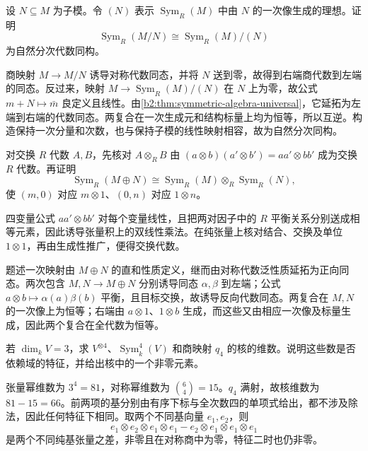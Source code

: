 \begin{exercise}\label{b2:ex:08-symmetric-quotient}
	设 \(N\subseteq M\) 为子模。令 \((N)\) 表示 \(\operatorname{Sym}_R(M)\) 中由 \(N\) 的一次像生成的理想。证明
	\[
		\operatorname{Sym}_R(M/N)\cong\operatorname{Sym}_R(M)/(N)
	\]
	为自然分次代数同构。
\end{exercise}
\begin{solution}
	商映射 \(M\rightarrow M/N\) 诱导对称代数同态，并将 \(N\) 送到零，故得到右端商代数到左端的同态。反过来，映射 \(M\rightarrow\operatorname{Sym}_R(M)/(N)\) 在 \(N\) 上为零，故公式 \(m+N\mapsto\bar m\) 良定义且线性。由\cref{b2:thm:symmetric-algebra-universal}，它延拓为左端到右端的代数同态。两复合在一次生成元和结构标量上均为恒等，所以互逆。构造保持一次分量和次数，也与保持子模的线性映射相容，故为自然分次同构。
\end{solution}

\begin{exercise}\label{b2:ex:08-symmetric-direct-sum}
	对交换 \(R\) 代数 \(A,B\)，先核对 \(A\otimes_RB\) 由 \((a\otimes b)(a'\otimes b')=aa'\otimes bb'\) 成为交换 \(R\) 代数。再证明
	\[
		\operatorname{Sym}_R(M\oplus N)\cong \operatorname{Sym}_R(M)\otimes_R\operatorname{Sym}_R(N),
	\]
	使 \((m,0)\) 对应 \(m\otimes1\)、\((0,n)\) 对应 \(1\otimes n\)。
\end{exercise}
\begin{solution}
	四变量公式 \(aa'\otimes bb'\) 对每个变量线性，且把两对因子中的 \(R\) 平衡关系分别送成相等元素，因此诱导张量积上的双线性乘法。在纯张量上核对结合、交换及单位 \(1\otimes1\)，再由生成性推广，便得交换代数。

	题述一次映射由 \(M\oplus N\) 的直和性质定义，继而由对称代数泛性质延拓为正向同态。两次包含 \(M,N\rightarrow M\oplus N\) 分别诱导同态 \(\alpha,\beta\) 到左端；公式 \(a\otimes b\mapsto\alpha(a)\beta(b)\) 平衡，且目标交换，故诱导反向代数同态。两复合在 \(M,N\) 的一次像上为恒等；右端由 \(a\otimes1\)、\(1\otimes b\) 生成，而这些又由相应一次像及标量生成，因此两个复合在全代数为恒等。
\end{solution}

\begin{exercise}\label{b2:ex:08-symmetric-dimension}
	若 \(\dim_kV=3\)，求 \(V^{\otimes4}\)、\(\operatorname{Sym}_k^4(V)\) 和商映射 \(q_4\) 的核的维数。说明这些数是否依赖域的特征，并给出核中的一个非零元素。
\end{exercise}
\begin{solution}
	张量幂维数为 \(3^4=81\)，对称幂维数为 \(\binom64=15\)。\(q_4\) 满射，故核维数为 \(81-15=66\)。前两项的基分别由有序下标与全次数四的单项式给出，都不涉及除法，因此任何特征下相同。取两个不同基向量 \(e_1,e_2\)，则
	\[
		e_1\otimes e_2\otimes e_1\otimes e_1 -e_2\otimes e_1\otimes e_1\otimes e_1
	\]
	是两个不同纯基张量之差，非零且在对称商中为零，特征二时也仍非零。
\end{solution}

